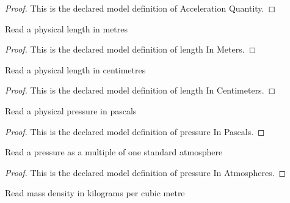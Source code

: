 \begin{proof}
  This is the declared model definition of Acceleration Quantity.
\end{proof}
\begin{definition}
  \label{def:physics:phyx-mini-0721:phyxminiproblems-problemphyxmini0721-lengthinmeters}
  Read a physical length in metres
\end{definition}
\begin{proof}
  This is the declared model definition of length In Meters.
\end{proof}
\begin{definition}
  \label{def:physics:phyx-mini-0721:phyxminiproblems-problemphyxmini0721-lengthincentimeters}
  Read a physical length in centimetres
\end{definition}
\begin{proof}
  This is the declared model definition of length In Centimeters.
\end{proof}
\begin{definition}
  \label{def:physics:phyx-mini-0721:phyxminiproblems-problemphyxmini0721-pressureinpascals}
  Read a physical pressure in pascals
\end{definition}
\begin{proof}
  This is the declared model definition of pressure In Pascals.
\end{proof}
\begin{definition}
  \label{def:physics:phyx-mini-0721:phyxminiproblems-problemphyxmini0721-pressureinatmospheres}
  Read a pressure as a multiple of one standard atmosphere
\end{definition}
\begin{proof}
  This is the declared model definition of pressure In Atmospheres.
\end{proof}
\begin{definition}
  \label{def:physics:phyx-mini-0721:phyxminiproblems-problemphyxmini0721-densityinkilogramspercubicmeter}
  Read mass density in kilograms per cubic metre
\end{definition}
